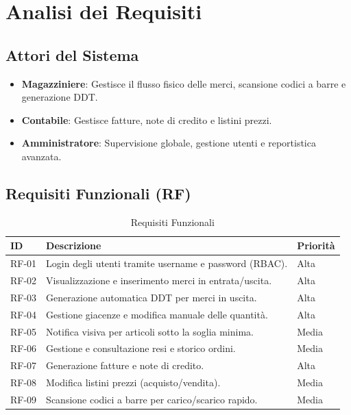 \documentclass[a4paper,12pt]{article}
\begin{document}
\section{Analisi dei Requisiti}
\subsection{Attori del Sistema}
\begin{itemize}
    \item \textbf{Magazziniere}: Gestisce il flusso fisico delle merci, scansione codici a barre e generazione DDT.
    \item \textbf{Contabile}: Gestisce fatture, note di credito e listini prezzi.
    \item \textbf{Amministratore}: Supervisione globale, gestione utenti e reportistica avanzata.
\end{itemize}

\subsection{Requisiti Funzionali (RF)}
\begin{longtable}{p{} p{} p{}}
\caption{Requisiti Funzionali} \\
\toprule
\textbf{ID} & \textbf{Descrizione} & \textbf{Priorità} \\
\midrule
RF-01 & Login degli utenti tramite username e password (RBAC). & Alta \\
RF-02 & Visualizzazione e inserimento merci in entrata/uscita. & Alta \\
RF-03 & Generazione automatica DDT per merci in uscita. & Alta \\
RF-04 & Gestione giacenze e modifica manuale delle quantità. & Alta \\
RF-05 & Notifica visiva per articoli sotto la soglia minima. & Media \\
RF-06 & Gestione e consultazione resi e storico ordini. & Media \\
RF-07 & Generazione fatture e note di credito. & Alta \\
RF-08 & Modifica listini prezzi (acquisto/vendita). & Media \\
RF-09 & Scansione codici a barre per carico/scarico rapido. & Media \\
\bottomrule
\end{longtable}
\end{document}
